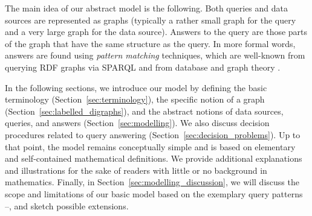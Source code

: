 The main idea of our abstract model is the following.
Both queries and data sources are represented as graphs
(typically a rather small graph for the query and a very large graph for the data source).
Answers to the query are those parts of the graph that have the same structure
as the query. In more formal words, answers are found using \emph{pattern matching} techniques,
which are well-known from querying \gls{RDF} graphs via \gls{SPARQL} \autocite{DellaValle2011}
and from database and graph theory \autocite{Abiteboul1995,Diestel2012}.

%
%

In the following sections, we introduce our model
by defining 
the basic terminology (Section~\ref{sec:terminology}),
the specific notion of a graph (Section~\ref{sec:labelled_digraphs}),
and the abstract notions of data sources, queries, and answers
(Section~\ref{sec:modelling}).
We also discuss decision procedures related to query answering (Section~\ref{sec:decision_problems}).
Up to that point, the model remains conceptually simple
and is based on elementary and self-contained mathematical definitions.
We provide additional explanations and illustrations
for the sake of readers with little or no background in mathematics.
%
Finally, in Section~\ref{sec:modelling_discussion}, we will discuss
the scope and limitations of our basic model based on the exemplary query patterns
--, and sketch possible extensions.

